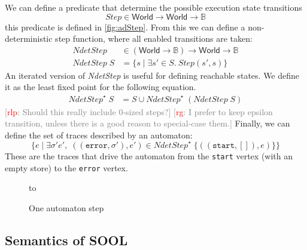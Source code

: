 \documentclass[preprint]{sigplanconf} %
\newcommand{\note}[2]{\textcolor{gray}{[\textcolor{red}{#1}: #2]}}
\newcommand{\rg}[1]{\note{rg}{#1}}
\newcommand{\rlp}[1]{\note{rlp}{#1}}
\newcommand{\B}{\ensuremath{\mathbb{B}}}
\newcommand{\set}[1]{\ensuremath{\mathsf{#1}}}
\theoremstyle{definition}
\theoremstyle{remark}
\begin{document}
We can define a predicate that determine the possible execution state transitions
\[
\mathit{Step}\in\set{World}\to\set{World}\to\B
\]
this predicate is defined in \autoref{fig:adStep}.
From this we can define a non-deterministic step function, where all
enabled transitions are taken:
\begin{align}
\mathit{NdetStep}&\in(\set{World}\to\B)\to\set{World}\to\B\\
\mathit{NdetStep}\;S&=\{ s \mid \exists s'\in S.\ \mathit{Step}(s', s) \} \label{eq:ndetstep}
\end{align}
An iterated version of \textit{NdetStep} is useful for defining reachable states.
We define it as the least fixed point for the following equation.
\begin{align}
\mathit{NdetStep}^\star\;S &= S \cup \mathit{NdetStep}^\star\;(\mathit{NdetStep}\;S)
\end{align}
\rlp{Should this really include 0-sized steps?}
\rg{I prefer to keep epsilon transition, unless there is a good reason to special-case them.}
Finally, we can define the set of traces described by an automaton:
\[
\{ e \mid
\exists\sigma'e',\;((\mathtt{error},\sigma'),e')\in\mathit{NdetStep}^\star\;\{((\mathtt{start},[]),e)\}
\}
\]
These are the traces that drive the automaton from the \texttt{start} vertex (with an empty store) to the \texttt{error} vertex.
\begin{figure}
\hbox to
\caption{One automaton step}
\label{fig:adStep}
\end{figure}
\subsection{Semantics of SOOL} \label{sec:semantics.sool} %
\end{document}
